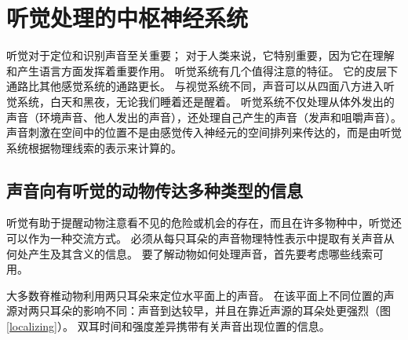 \chapter{听觉处理的中枢神经系统}
听觉对于定位和识别声音至关重要； 对于人类来说，它特别重要，因为它在理解和产生语言方面发挥着重要作用。 听觉系统有几个值得注意的特征。 它的皮层下通路比其他感觉系统的通路更长。 与视觉系统不同，声音可以从四面八方进入听觉系统，白天和黑夜，无论我们睡着还是醒着。 听觉系统不仅处理从体外发出的声音（环境声音、他人发出的声音），还处理自己产生的声音（发声和咀嚼声音）。 声音刺激在空间中的位置不是由感觉传入神经元的空间排列来传达的，而是由听觉系统根据物理线索的表示来计算的。

\section{声音向有听觉的动物传达多种类型的信息}
听觉有助于提醒动物注意看不见的危险或机会的存在，而且在许多物种中，听觉还可以作为一种交流方式。 必须从每只耳朵的声音物理特性表示中提取有关声音从何处产生及其含义的信息。 要了解动物如何处理声音，首先要考虑哪些线索可用。

大多数脊椎动物利用两只耳朵来定位水平面上的声音。 在该平面上不同位置的声源对两只耳朵的影响不同：声音到达较早，并且在靠近声源的耳朵处更强烈（图\ref{localizing}）。 双耳时间和强度差异携带有关声音出现位置的信息。

